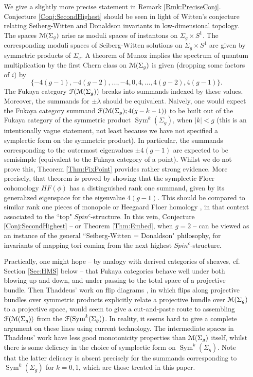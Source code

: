 \documentclass[reqno,10pt]{amsart}
\numberwithin{equation}{section}
\newcommand{\scrF}{\EuScript{F}}
\newcommand{\scrM}{\EuScript{M}}
\newcommand{\Sym}{\operatorname{Sym}}
\theoremstyle{remark}
\begin{document}
We give a slightly more precise statement in Remark \ref{Rmk:PreciseConj}. Conjecture \ref{Conj:SecondHighest} should be seen in light of Witten's conjecture relating Seiberg-Witten and Donaldson invariants in low-dimensional topology.  The spaces $\scrM(\Sigma_g)$ arise as moduli spaces of instantons on $\Sigma_g \times S^1$.  The corresponding moduli spaces of Seiberg-Witten solutions on $\Sigma_g \times S^1$ are given by symmetric products of $\Sigma_g$.    A theorem of Munoz \cite{Munoz} implies the spectrum of quantum multiplication by the first Chern class on $\scrM(\Sigma_g)$ is given (dropping some factors of $i$) by 
\[
\{-4(g-1), -4(g-2), \ldots, -4, 0, 4, \ldots, 4(g-2),  4(g-1)\}.
\]
The Fukaya category $\scrF(\scrM(\Sigma_g))$  breaks into summands indexed by these values.  Moreover, the summands for $\pm \lambda$ should be equivalent.  Naively, one would expect the Fukaya category summand $\scrF(\scrM(\Sigma_g); 4(g-k-1))$ to be built out of the Fukaya category of the symmetric product $\Sym^k(\Sigma_g)$, when $|k| < g$ (this is an intentionally vague statement, not least because we have not specified a symplectic form on the symmetric product).  In particular, the summands corresponding to the outermost eigenvalues $\pm 4(g-1)$ are expected to be semisimple (equivalent to the Fukaya category of a point).  Whilst we do not prove this, Theorem \ref{Thm:FixPoint} provides rather strong evidence. More precisely, that theorem is proved by showing that the symplectic Floer cohomology $HF(\phi)$ has a distinguished rank one summand, given by its generalized eigenspace for the eigenvalue $4(g-1)$.  This should be compared to similar rank one pieces of monopole or Heegaard Floer homology \cite{OzSz,KronheimerMrowka:Sutured}, in that context associated to the ``top" $Spin^c$-structure.  In this vein, Conjecture \ref{Conj:SecondHighest} -- or Theorem \ref{Thm:Embed}, when $g=2$ -- can be viewed as an instance of the general ``Seiberg-Witten = Donaldson" philosophy, for invariants of mapping tori coming from the next highest $Spin^c$-structure.  

Practically, one might hope -- by analogy with derived categories of sheaves, cf. Section \ref{Sec:HMS} below -- that Fukaya categories behave well under both blowing up and down, and under passing to the total space of a projective bundle.  Then 
Thaddeus' work on flip diagrams \cite{Thaddeus}, in which flips along projective bundles over symmetric products explicitly relate a projective bundle over $\scrM(\Sigma_g)$ to a projective space, would seem to give a cut-and-paste route to assembling $\scrF(\scrM(\Sigma_g))$ from the $\scrF(\Sym^k(\Sigma_g))$.  In reality, it seems hard to give a complete argument on these lines using current technology. The intermediate spaces in Thaddeus' work have less good monotonicity properties than $\scrM(\Sigma_g)$ itself, whilst there is some delicacy in the choice of symplectic form on $\Sym^k(\Sigma_g)$. Note that the latter delicacy is absent precisely for the summands corresponding to $\Sym^k(\Sigma_g)$ for $k=0,1$, which are those treated in this paper. 
\end{document}
